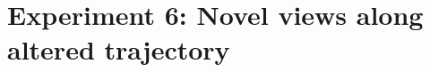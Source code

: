 

\begin{comment}
- As expected, the camera optimizer provides better results than the contrary on real data with imperfect camera poses. Atleast it ha a significantly higher PSNR, how do they compare qualitatively?
- As with the synthetic data, the optimized runs appear more blurry, but still achieves better scores on the metrics.


In the set of experiments that did not implement the naive Block NeRF approach, the results display noteworthy distinctions between different methodologies. The experiment wherein camera poses were approximated using COLMAP and subsequently optimized rendered the highest Peak Signal-to-Noise Ratio (PSNR). This particular experiment demonstrates superior performance in preserving original image detail and quality.

However, interestingly, the experiment utilizing COLMAP without any subsequent optimization yielded the best results in terms of the Structural Similarity Index Measure (SSIM) and the Learned Perceptual Image Patch Similarity (LPIPS). Despite these metrics being extremely close to the COLMAP run with optimization, their distinction in results is worth noting.

Delving deeper into qualitative outcomes, a stark contrast is observed between the two COLMAP runs. The experiment leveraging optimized camera poses generated results with a distinctly higher degree of blurriness compared to its counterpart that did not utilize optimized poses.

This observation highlights the intriguing impact of pose optimization on image clarity and indicates that while certain metrics might be optimized, subjective visual quality and the overall objective might vary significantly. These results collectively underline the complex interplay between technical metrics and perceptual outcomes in the realm of NeRF generation.
\end{comment}


\section{Experiment 6: Novel views along altered trajectory} \label{sec:altered-trajectories}

